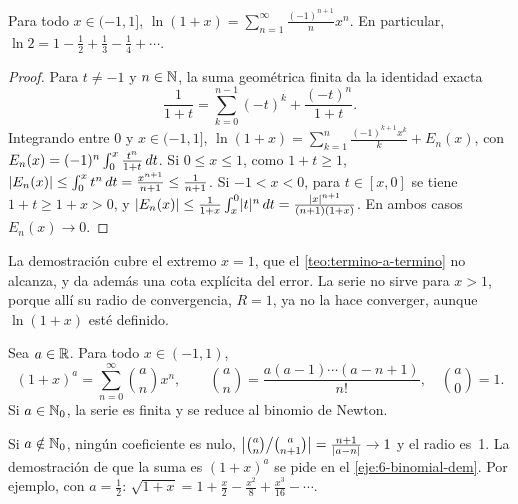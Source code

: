 \begin{teorema}[Logaritmo]\label{teo:ln}
Para todo $x\in(-1,1]$, $\displaystyle\ln(1+x)=\sum_{n=1}^{\infty}\frac{(-1)^{n+1}}{n}x^{n}$. En particular, $\displaystyle\ln2=1-\frac12+\frac13-\frac14+\cdots$.
\end{teorema}

\begin{proof}
Para $t\neq-1$ y $n\in\mathbb{N}$, la suma geométrica finita da la identidad exacta
\[
\frac{1}{1+t}=\sum_{k=0}^{n-1}(-t)^{k}+\frac{(-t)^{n}}{1+t}.
\]
Integrando entre $0$ y $x\in(-1,1]$,
$\ln(1+x)=\sum_{k=1}^{n}\frac{(-1)^{k+1}x^{k}}{k}+E_n(x)$, con $E_n(x)=(-1)^{n}\int_0^{x}\frac{t^{n}}{1+t}\mathop{}\!d t$. Si $0\le x\le1$, como $1+t\ge1$, $\lvert E_n(x)\rvert\le\int_0^{x}t^{n}\mathop{}\!d t=\frac{x^{n+1}}{n+1}\le\frac{1}{n+1}$. Si $-1<x<0$, para $t\in[x,0]$ se tiene $1+t\ge1+x>0$, y $\lvert E_n(x)\rvert\le\frac{1}{1+x}\int_x^{0}\lvert t\rvert^{n}\mathop{}\!d t=\frac{\lvert x\rvert^{n+1}}{(n+1)(1+x)}$. En ambos casos $E_n(x)\to0$.
\end{proof}

La demostración cubre el extremo $x=1$, que el \cref{teo:termino-a-termino} no alcanza, y da además una cota explícita del error. La serie no sirve para $x>1$, porque allí su radio de convergencia, $R=1$, ya no la hace converger, aunque $\ln(1+x)$ esté definido.

\begin{teorema}\label{teo:binomial}
Sea $a\in\mathbb{R}$. Para todo $x\in(-1,1)$,
\[
(1+x)^{a}=\sum_{n=0}^{\infty}\binom{a}{n}x^{n},\qquad\binom{a}{n}=\frac{a(a-1)\cdots(a-n+1)}{n!},\quad\binom{a}{0}=1 .
\]
Si $a\in\mathbb{N}_0$, la serie es finita y se reduce al binomio de Newton.
\end{teorema}

Si $a\notin\mathbb{N}_0$, ningún coeficiente es nulo, $\bigl|\binom{a}{n}\big/\binom{a}{n+1}\bigr|=\frac{n+1}{\lvert a-n\rvert}\to1$ y el radio es~1. La demostración de que la suma es $(1+x)^{a}$ se pide en el \cref{eje:6-binomial-dem}. Por ejemplo, con $a=\frac12$: $\sqrt{1+x}=1+\frac x2-\frac{x^{2}}{8}+\frac{x^{3}}{16}-\cdots$.

